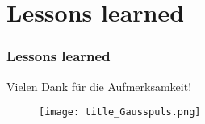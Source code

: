 \documentclass[
	11pt, %
	aspectratio=169, %
]{beamer}
\begin{document}


 \section{Lessons learned}

 \begin{frame}
 	\frametitle{Lessons learned}

 \end{frame}



\begin{frame} %
	 	\begin{center}
		
		\bigskip \bigskip %
		
		{\Large Vielen Dank für die Aufmerksamkeit!}
		\begin{figure}
			\texttt{[image: title\_Gausspuls.png]}
		\end{figure}
	\end{center}
 \end{frame}

\end{document}

